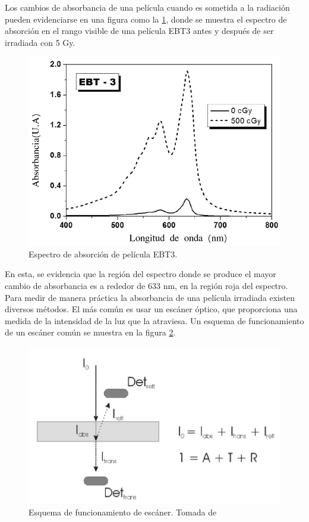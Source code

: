 Los cambios de absorbancia de una película cuando es sometida a la radiación pueden evidenciarse en una figura como la \ref{fig:AsorbanciaEBT3}, donde se muestra el espectro de absorción en el rango visible de una película EBT3 antes y después de ser irradiada con 5 Gy.\\
\begin{figure}[H]
	\centering
	\includegraphics[width=0.7\linewidth]{images/absorbancia.png}
	\caption{Espectro de absorción de película EBT3\cite{Devic2016}.}
	\label{fig:AsorbanciaEBT3}
\end{figure}

En esta, se evidencia que la región del espectro donde se produce el mayor cambio de absorbancia es a rededor de 633 nm, en la región roja del espectro.\\

Para medir de manera práctica la absorbancia de una película irradiada existen diversos métodos. El más común es usar un escáner óptico, que proporciona una medida de la intensidad de la luz que la atraviesa. Un esquema de funcionamiento de un escáner común se muestra en la figura \ref{fig:escaner}.\\ 
\begin{figure}[H]
	\centering
	\includegraphics[width=0.7\linewidth]{images/escaner.png}
	\caption{Esquema de funcionamiento de escáner. Tomada de \cite{Devic2016}}
	\label{fig:escaner}
\end{figure}

